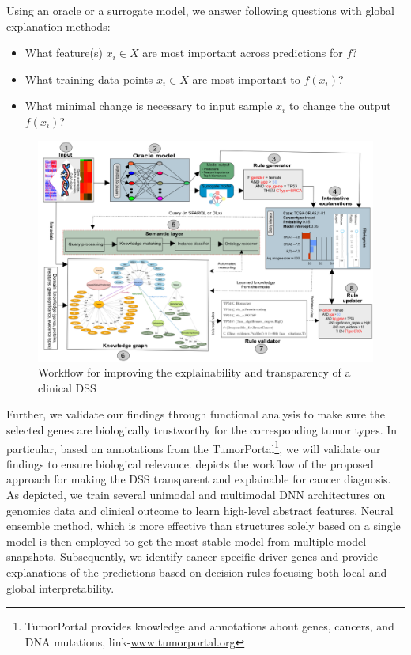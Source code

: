 \hspace*{3.5mm} Using an oracle or a surrogate model, we answer following questions with global explanation methods: 

\begin{itemize}[noitemsep]
    \item What feature(s) $x_i \in X$ are most important across predictions for $f$?
    \item What training data points $x_i \in X$ are most important to $f(x_i)$? 
    \item What minimal change is necessary to input sample $x_i$ to change the output $f(x_i)$?
\end{itemize}

\begin{figure}
	\centering
	\includegraphics[scale=0.8]{images/reasoning_wf.png}
    \caption{Workflow for improving the explainability and transparency of a clinical DSS}
	\label{fig:wf_overall_approach}
\end{figure}

\hspace*{3.5mm} Further, we validate our findings through functional analysis to make sure the selected genes are biologically trustworthy for the corresponding tumor types. In particular, based on annotations from the TumorPortal\footnote{
TumorPortal provides knowledge and annotations about genes, cancers, and DNA mutations, link-\url{www.tumorportal.org}}, we will validate our findings to ensure biological relevance.  depicts the workflow of the proposed approach for making the DSS transparent and explainable for cancer diagnosis. As depicted, we train several unimodal and multimodal DNN architectures on genomics data and clinical outcome to learn high-level abstract features. Neural ensemble method, which is more effective than structures solely based on a single model is then employed to get the most stable model from multiple model snapshots. Subsequently, we identify cancer-specific driver genes and provide explanations of the predictions based on decision rules focusing both local and global interpretability. 

